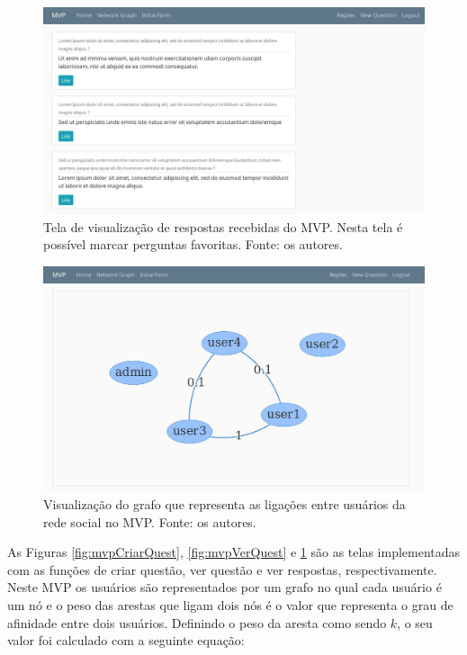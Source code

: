 \begin{figure}[!htb]
\centering
\includegraphics[width=14cm]{mvpVerResp.png}
\caption{Tela de visualização de respostas recebidas do MVP. Nesta tela é possível marcar perguntas favoritas. Fonte: os autores.}
\label{fig:mvpVerResp}
\end{figure}

\begin{figure}[!htb]
\centering
\includegraphics[width=14cm]{mvpVerGrafo.png}
\caption{Visualização do grafo que representa as ligações entre usuários da rede social no MVP. Fonte: os autores.}
\label{fig:mvpVerGrafo}
\end{figure}

As Figuras \ref{fig:mvpCriarQuest}, \ref{fig:mvpVerQuest} e \ref{fig:mvpVerResp} são as telas implementadas com as funções de criar questão, ver questão e ver respostas, respectivamente. Neste MVP os usuários são representados por um grafo no qual cada usuário é um nó e o peso das arestas que ligam dois nós é o valor que representa o grau de afinidade entre dois usuários. Definindo o peso da aresta como sendo $k$, o seu valor foi calculado com a seguinte equação: 

